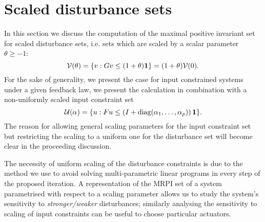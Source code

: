 %
%
%
\section{Scaled disturbance sets}\label{sec:scaled:disturbance:sets}
In this section we discuss the computation of the maximal positive invariant set for scaled disturbance
sets, i.e. sets which are scaled by a scalar parameter~$\theta\geq-1$:
%
\begin{equation}
\mathcal V(\theta) = \{v: Gv\leq(1+\theta){\bf{1}}\}
= (1+\theta)\mathcal V(0).
\end{equation}
%
For the sake of generality, we present the case for input constrained systems under a given feedback law,
we present the calculation in combination with a non-uniformly scaled input constraint set
%
\begin{equation}\label{eq:parametrised:input:constraints:non:uniform}
\mathcal U({\bf{\alpha}}) = \{u: Fu\leq\left(I+\text{diag}(\alpha_1,\dots,\alpha_p)\right){\bf{1}}\}.
\end{equation}
%
The reason for allowing general scaling parameters for the input constraint set but restricting the scaling
to a uniform one for the disturbance set will become clear in the proceeding discussion.

The necessity of uniform scaling of the disturbance constraints is due to the method we use to avoid
solving multi-parametric linear programs in every step of the proposed iteration.
A representation of the MRPI set of a system parametrised with respect to a scaling parameter allows us
to study the system's sensitivity to \emph{stronger/weaker} disturbances; similarly analysing the sensitivity to scaling of input 
constraints can be useful to choose particular actuators.

